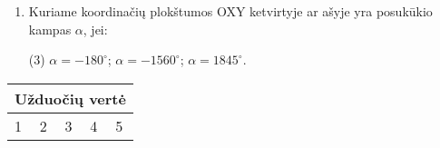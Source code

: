 \documentclass[a4paper]{article}
\begin{document}
\begin{enumerate}
      \item Kuriame koordinačių plokštumos OXY ketvirtyje ar ašyje yra
            posukūkio kampas $\alpha$, jei:

            \begin{tasks}[item-format={\normalfont},
                        after-item-skip=4mm](3)
                  \task $\alpha = -180^\circ$;
                  \task $\alpha = -1560^\circ$;
                  \task $\alpha = 1845^\circ$.
            \end{tasks}

\end{enumerate}

\begin{table}[!htpb]
      \centering
      \begin{tabular}{|lllllllllllllll|}
            \hline
            \multicolumn{15}{|l|}{Užduočių vertė}

            \\ \hline
            \multicolumn{3}{|l|}{1}

             & \multicolumn{2}{l|}{2}

             & \multicolumn{4}{l|}{3}

             &
            \multicolumn{3}{l|}{4}

             & \multicolumn{3}{l|}{5}


\end{tabular}
\end{table}
\end{document}
